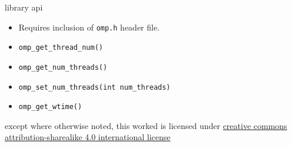 \documentclass[10pt,t]{beamer}
\begin{document}
  \begin{frame}{library api}
    \begin{itemize}
      \item Requires inclusion of \texttt{omp.h} header file.
    \end{itemize}

    \begin{itemize}
      \item \texttt{omp\_get\_thread\_num()}
      \item \texttt{omp\_get\_num\_threads()}
      \item \texttt{omp\_set\_num\_threads(int num\_threads)}
      \item \texttt{omp\_get\_wtime()}
    \end{itemize}
  \end{frame}

  \appendix

  \begin{frame}[c]
    \begin{center}\ccbysa\end{center}

    except where otherwise noted, this worked is licensed under
    \href{http://creativecommons.org/licenses/by-sa/4.0/}{creative commons
    attribution-sharealike 4.0 international license}
  \end{frame}
\end{document}
